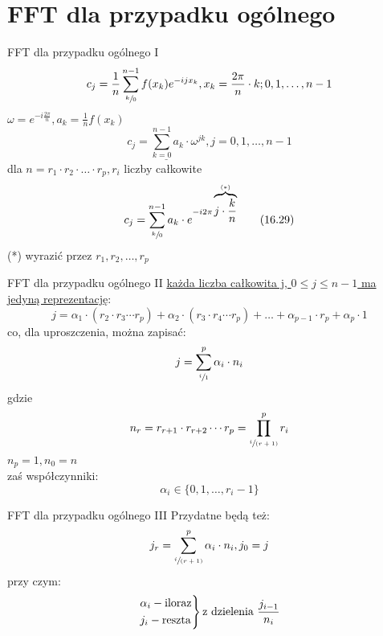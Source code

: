 \section{FFT dla przypadku ogólnego}
\begin{frame}{FFT dla przypadku ogólnego I}
	\[
		c_j = \frac{1}{n} \sum\limits_{\sfrac{k}{0}}^{n-1} f(x_k)e^{-ijx_k}, x_k = \frac{2\pi}{n} \cdot k; 0, 1, \dots, n-1
	\]
	$\omega = e^{-i\frac{2\pi}{n}}, a_k = \frac{1}{n} f(x_k)$
	\[
		\underline{c_j = \sum\limits_{k = 0}^{n-1} a_k \cdot \omega^{jk}}, j = 0, 1, \dots, n-1
	\]
	dla $n = r_1 \cdot r_2 \cdot \dots \cdot r_p, r_i$ liczby całkowite
	\[
		c_j = \sum\limits_{\sfrac{k}{0}}^{n-1} a_k \cdot e^{-i2\pi \overbrace{j \cdot \frac{k}{n}}^{(*)}}
		\tag{16.29}
	\]
	(*) wyrazić przez $r_1, r_2, \dots, r_p$
\end{frame}
\begin{frame}{FFT dla przypadku ogólnego II}
	\underline{każda liczba całkowita j, $0 \leq j \leq n-1$ ma jedyną reprezentację}:
	\[
		j = \alpha_1 \cdot (r_2 \cdot r_3 \cdots r_p) + \alpha_2 \cdot (r_3 \cdot r_4 \cdots r_p) + \dots + \alpha_{p-1} \cdot r_p + \alpha_p \cdot 1
	\]
	co, dla uproszczenia, można zapisać:
	\[
		j = \sum\limits_{\sfrac{i}{1}}^{p} \alpha_i \cdot n_i
	\]
	gdzie
	\[
		n_r = r_{r+1} \cdot r_{r+2} \cdots r_p = \prod\limits_{\sfrac{i}{(r+1)}}^{p} r_i
	\]
	$n_p = 1, n_0 = n$ \\
	zaś współczynniki:
	\[
		\alpha_i \in \{0, 1, \dots, r_i - 1\}
	\]
\end{frame}
\begin{frame}{FFT dla przypadku ogólnego III}
	Przydatne będą też:
	\[
		j_r = \sum\limits_{\sfrac{i}{(r+1)}}^{p} \alpha_i \cdot n_i, j_0 = j
	\]
	przy czym:
	\[
		\begin{rcases}
			\alpha_i - \text{iloraz} \\
			j_i - \text{reszta}
		\end{rcases}
		\text{z dzielenia } \frac{j_{i-1}}{n_i}
	\]
\end{frame}
